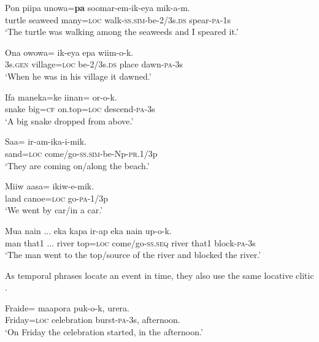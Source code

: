 \ea%
\label{ex:3:x762}
\gll Pon piipa unowa=\textbf{pa} soomar-em-ik-eya mik-a-m. \\
turtle seaweed many=\textsc{loc} walk-\textsc{ss}.\textsc{sim}-be-2/3s.\textsc{ds} spear-\textsc{pa}-1s\\
\glt`The turtle was walking among the seaweeds and I speared it.'
\z

\ea%
\label{ex:3:x1880}
\gll Ona owowa= ik-eya epa wiim-o-k. \\
3s.\textsc{gen} village=\textsc{loc} be-2/3s.\textsc{ds} place dawn-\textsc{pa}-3s\\
\glt`When he was in his village it dawned.'
\z

\ea%
\label{ex:3:x1877}
\gll Ifa maneka=ke iinan= or-o-k. \\
snake big=\textsc{cf} on.top=\textsc{loc} descend-\textsc{pa}-3s\\
\glt`A big snake dropped from above.'
\z

\ea%
\label{ex:3:x770}
\gll Saa= ir-am-ika-i-mik. \\
sand=\textsc{loc} come/go-\textsc{ss}.\textsc{sim}-be-Np-\textsc{pr}.1/3p\\
\glt`They are coming on/along the beach.'
\z

\ea%
\label{ex:3:x771}
\gll Miiw aasa= ikiw-e-mik. \\
land canoe=\textsc{loc} go-\textsc{pa}-1/3p\\
\glt`We went by car/in a car.'
\z

\ea%
\label{ex:3:x1879}
\gll Mua nain ... eka kapa ir-ap eka nain up-o-k.\\
man that1 ... river top=\textsc{loc} come/go-\textsc{ss}.\textsc{seq} river that1 block-\textsc{pa}-3s\\
\glt`The man went to the top/source of the river and blocked the river.'
\z

As temporal phrases locate an event in time, they also use the same locative clitic .

\ea%
\label{ex:3:x763}
\gll Fraide= maapora puk-o-k, urera. \\
Friday=\textsc{loc} celebration burst-\textsc{pa}-3s, afternoon.\\
\glt`On Friday the celebration started, in the afternoon.'
\z

